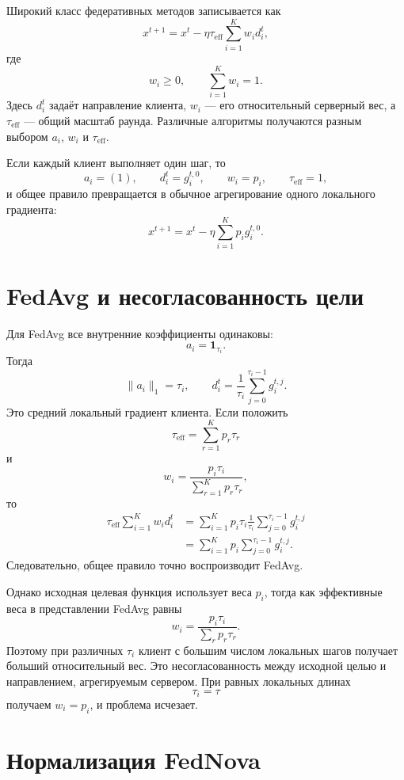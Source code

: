 Широкий класс федеративных методов записывается как
\[
    x^{t+1}
    =
    x^t
    -
    \eta\tau_{\mathrm{eff}}
    \sum_{i=1}^{K}w_i d_i^t,
\]
где
\[
    w_i\ge0,
    \qquad
    \sum_{i=1}^{K}w_i=1.
\]
Здесь \(d_i^t\) задаёт направление клиента, \(w_i\) --- его
относительный серверный вес, а \(\tau_{\mathrm{eff}}\) --- общий
масштаб раунда. Различные алгоритмы получаются разным выбором
\(a_i\), \(w_i\) и \(\tau_{\mathrm{eff}}\).

Если каждый клиент выполняет один шаг, то
\[
    a_i=(1),
    \qquad
    d_i^t=g_i^{t,0},
    \qquad
    w_i=p_i,
    \qquad
    \tau_{\mathrm{eff}}=1,
\]
и общее правило превращается в обычное агрегирование одного
локального градиента:
\[
    x^{t+1}
    =
    x^t-
    \eta\sum_{i=1}^{K}p_i g_i^{t,0}.
\]

\section{FedAvg и несогласованность цели}

Для FedAvg все внутренние коэффициенты одинаковы:
\[
    a_i=\mathbf1_{\tau_i}.
\]
Тогда
\[
    \lVert a_i\rVert_1=\tau_i,
    \qquad
    d_i^t
    =
    \frac1{\tau_i}
    \sum_{j=0}^{\tau_i-1}g_i^{t,j}.
\]
Это средний локальный градиент клиента. Если положить
\[
    \tau_{\mathrm{eff}}
    =
    \sum_{r=1}^{K}p_r\tau_r
\]
и
\[
    w_i
    =
    \frac{p_i\tau_i}
    {\displaystyle\sum_{r=1}^{K}p_r\tau_r},
\]
то
\[
\begin{aligned}
    \tau_{\mathrm{eff}}
    \sum_{i=1}^{K}w_i d_i^t
    &=
    \sum_{i=1}^{K}
    p_i\tau_i
    \frac1{\tau_i}
    \sum_{j=0}^{\tau_i-1}g_i^{t,j}
    \\
    &=
    \sum_{i=1}^{K}p_i
    \sum_{j=0}^{\tau_i-1}g_i^{t,j}.
\end{aligned}
\]
Следовательно, общее правило точно воспроизводит FedAvg.

Однако исходная целевая функция использует веса \(p_i\), тогда как
эффективные веса в представлении FedAvg равны
\[
    w_i
    =
    \frac{p_i\tau_i}
    {\sum_r p_r\tau_r}.
\]
Поэтому при различных \(\tau_i\) клиент с большим числом локальных
шагов получает больший относительный вес. Это несогласованность между исходной целью и направлением, агрегируемым сервером. При равных
локальных длинах
\[
    \tau_i=\tau
\]
получаем \(w_i=p_i\), и проблема исчезает.

\section{Нормализация FedNova}

